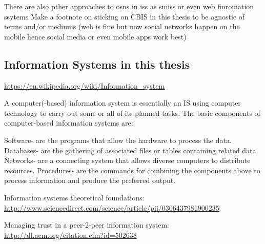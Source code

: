\documentclass[showtrims,oldfontcommands]{kthesis}
\begin{document}
There are also pther approaches to \acp{osn} in \acp{is} as \acp{smis} or even web 
finromation ssytems
Make a footnote on sticking on CBIS in this thesis to be agnostic of terms and/or mediums (web is fine but now social networks happen on the mobile hence social media or even mobile apps work best)



\subsection{Information Systems in this thesis}
    \label{subsection:information-system-in-this-thesis}

\url{https://en.wikipedia.org/wiki/Information_system}

A computer(-based) information system is essentially an IS using computer technology to carry out some or all of its planned tasks. The basic components of computer-based information systems are:

Software- are the programs that allow the hardware to process the data.
Databases- are the gathering of associated files or tables containing related data.
Networks- are a connecting system that allows diverse computers to distribute resources.
Procedures- are the commands for combining the components above to process information and produce the preferred output.

Information systems theoretical foundations: \url{http://www.sciencedirect.com/science/article/pii/0306437981900235}

Managing trust in a peer-2-peer information system: \url{http://dl.acm.org/citation.cfm?id=502638}
\end{document}
